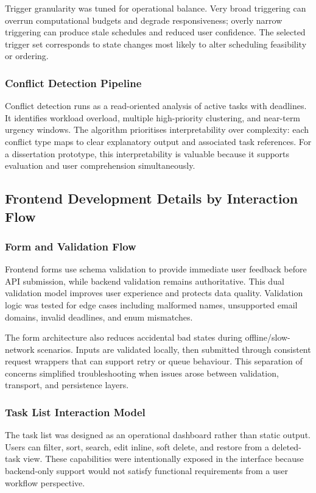 \documentclass[12pt]{article}
\begin{document}
Trigger granularity was tuned for operational balance. Very broad triggering can overrun computational budgets and degrade responsiveness; overly narrow triggering can produce stale schedules and reduced user confidence. The selected trigger set corresponds to state changes most likely to alter scheduling feasibility or ordering.

\subsubsection{Conflict Detection Pipeline}
Conflict detection runs as a read-oriented analysis of active tasks with deadlines. It identifies workload overload, multiple high-priority clustering, and near-term urgency windows. The algorithm prioritises interpretability over complexity: each conflict type maps to clear explanatory output and associated task references. For a dissertation prototype, this interpretability is valuable because it supports evaluation and user comprehension simultaneously.

\subsection{Frontend Development Details by Interaction Flow}
\subsubsection{Form and Validation Flow}
Frontend forms use schema validation to provide immediate user feedback before API submission, while backend validation remains authoritative. This dual validation model improves user experience and protects data quality. Validation logic was tested for edge cases including malformed names, unsupported email domains, invalid deadlines, and enum mismatches.

The form architecture also reduces accidental bad states during offline/slow-network scenarios. Inputs are validated locally, then submitted through consistent request wrappers that can support retry or queue behaviour. This separation of concerns simplified troubleshooting when issues arose between validation, transport, and persistence layers.

\subsubsection{Task List Interaction Model}
The task list was designed as an operational dashboard rather than static output. Users can filter, sort, search, edit inline, soft delete, and restore from a deleted-task view. These capabilities were intentionally exposed in the interface because backend-only support would not satisfy functional requirements from a user workflow perspective.
\end{document}
